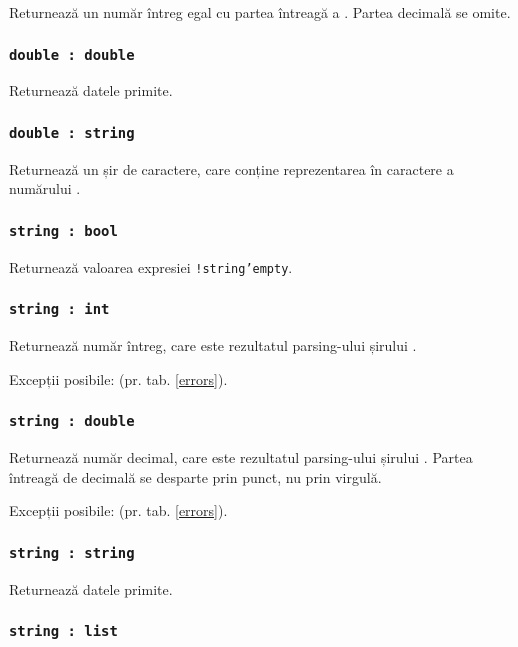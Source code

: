 Returnează un număr întreg egal cu partea întreagă a \double. Partea decimală se omite.

\subsubsection{\texttt{double : double}}

Returnează datele primite.

\subsubsection{\texttt{double : string}}

Returnează un șir de caractere, care conține reprezentarea în caractere a numărului \double.

\subsubsection{\texttt{string : bool}}

Returnează valoarea expresiei \texttt{!string'empty}.

\subsubsection{\texttt{string : int}}

Returnează număr întreg, care este rezultatul parsing-ului șirului \str.

Excepții posibile:  (pr. tab. \ref{errors}).

\subsubsection{\texttt{string : double}}

Returnează număr decimal, care este rezultatul parsing-ului șirului \str. Partea întreagă de decimală se desparte prin punct, nu prin virgulă.

Excepții posibile:  (pr. tab. \ref{errors}).

\subsubsection{\texttt{string : string}}

Returnează datele primite.

\subsubsection{\texttt{string : list}}

